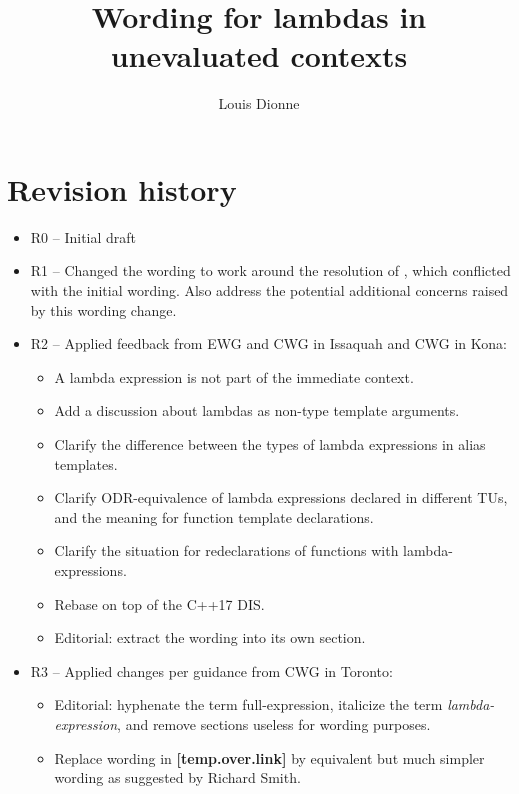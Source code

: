 \documentclass{wg21}
\title{Wording for lambdas in unevaluated contexts}
\author{Louis Dionne}{ldionne.2@gmail.com}
\begin{document}
\maketitle
\tableofcontents

\section{Revision history}
\begin{itemize}
  \item R0 -- Initial draft
  \item R1 -- Changed the wording to work around the resolution of \cite{DR1607},
              which conflicted with the initial wording. Also address the
              potential additional concerns raised by this wording change.
  \item R2 -- Applied feedback from EWG and CWG in Issaquah and CWG in Kona:
              \begin{itemize}
                \item A lambda expression is not part of the immediate context.
                \item Add a discussion about lambdas as non-type template arguments.
                \item Clarify the difference between the types of lambda expressions
                      in alias templates.
                \item Clarify ODR-equivalence of lambda expressions declared in
                      different TUs, and the meaning for function template
                      declarations.
                \item Clarify the situation for redeclarations of functions with
                      lambda-expressions.
                \item Rebase on top of the C++17 DIS.
                \item Editorial: extract the wording into its own section.
              \end{itemize}
  \item R3 -- Applied changes per guidance from CWG in Toronto:
    \begin{itemize}
      \item Editorial: hyphenate the term full-expression, italicize the
            term \textit{lambda-expression}, and remove sections useless
            for wording purposes.
      \item Replace wording in \textbf{[temp.over.link]} by equivalent but
            much simpler wording as suggested by Richard Smith.

\end{itemize}
\end{itemize}
\end{document}
